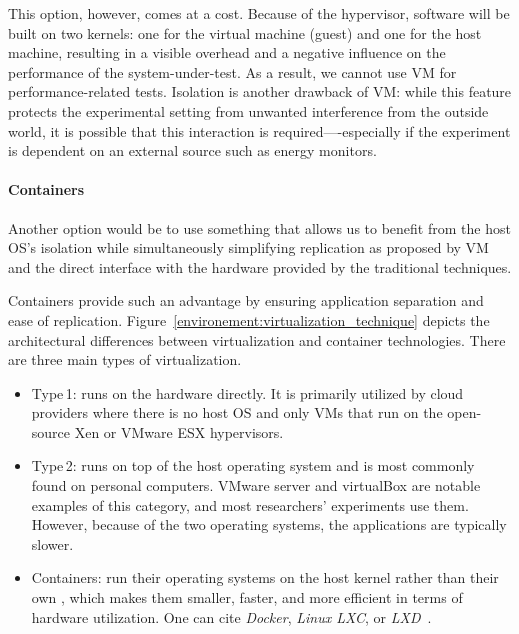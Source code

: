 This option, however, comes at a cost. Because of the hypervisor, software will be built on two kernels: one for the virtual machine (guest) and one for the host machine, resulting in a visible overhead and a negative influence on the performance of the system-under-test.
As a result, we cannot use VM for performance-related tests.
Isolation is another drawback of VM: while this feature protects the experimental setting from unwanted interference from the outside world, it is possible that this interaction is required—-especially if the experiment is dependent on an external source such as energy monitors.

\paragraph{Containers}
Another option would be to use something that allows us to benefit from the host OS's isolation while simultaneously simplifying replication as proposed by VM and the direct interface with the hardware provided by the traditional techniques.

Containers provide such an advantage by ensuring application separation and ease of replication.
Figure~\ref{environement:virtualization_technique} depicts the architectural differences between virtualization and container technologies. There are three main types of virtualization.
\begin{itemize}
    \item \textsf{Type\,1}: runs on the hardware directly.
          It is primarily utilized by cloud providers where there is no host OS and only VMs that run on the open-source Xen or VMware ESX hypervisors.

    \item \textsf{Type\,2}: runs on top of the host operating system and is most commonly found on personal computers. VMware server and virtualBox are notable examples of this category, and most researchers' experiments use them.
          However, because of the two operating systems, the applications are typically slower.

    \item \textsf{Containers}: run their operating systems on the host kernel rather than their own , which makes them smaller, faster, and more efficient in terms of hardware utilization. One can cite \emph{Docker}, \emph{Linux LXC}, or \emph{LXD}~\cite{abuabdo_virtualization_2019}.
\end{itemize}


